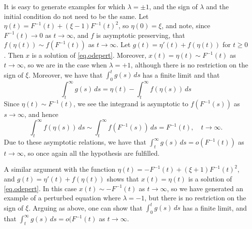 \documentclass[a4paper,10pt,reqno]{amsart}
\numberwithin{equation}{section}
\theoremstyle{definition}
\theoremstyle{remark}
\DeclareMathOperator{\1}{\mathbbm 1}
\begin{document}
	It is easy to generate examples for which $\lambda=\pm 1$, and the sign of $\lambda$ and the initial condition do not need to be the same. Let $\eta(t)=F^{-1}(t)+(\xi-1)F^{-1}(t)^2$, so $\eta(0)=\xi$, and note, since $F^{-1}(t)\to 0$ as $t\to\infty$, and $f$ is asymptotic preserving, that $f(\eta(t))\sim f(F^{-1}(t))$ as $t\to\infty$. Let $g(t)=\eta'(t)+f(\eta(t))$ for $t\geq 0$. Then $x$ is a solution of \eqref{eq.odepert}. Moreover, $x(t)=\eta(t)\sim F^{-1}(t)$ as $t\to\infty$, so we are in the case when $\lambda=+1$, although there is no restriction on the sign of $\xi$. Moreover, we have that $\int_0^t g(s)\,ds$ has a finite limit and that 
	\[
	\int_t^\infty g(s)\,ds = \eta(t)-\int_t^\infty f(\eta(s))\,ds
	\]   
	Since $\eta(t)\sim F^{-1}(t)$, we see the integrand is asymptotic  to $f(F^{-1}(s))$ as $s\to\infty$, and hence 
	\[
	\int_{t}^\infty  f(\eta(s))\,ds\sim \int_t^\infty f(F^{-1}(s))\,ds = F^{-1}(t), \quad t\to \infty. 
	\]
	Due to these asymptotic relations, we have that $\int_t^\infty g(s)\,ds=o(F^{-1}(t))$ as $t\to\infty$, so once again all the hypothesis are fulfilled.
	
	A similar argument with the function $\eta(t)=-F^{-1}(t)+(\xi+1)F^{-1}(t)^2$, and $g(t)=\eta'(t)+f(\eta(t))$ shows that $x(t)=\eta(t)$ is a solution of \eqref{eq.odepert}. In this case $x(t)\sim -F^{-1}(t)$ as $t\to\infty$, so we have generated an example of a perturbed equation where $\lambda=-1$, but there is no restriction on the sign of $\xi$. Arguing as above, one can show that $\int_0^t g(s)\,ds$ has a finite limit, and that $\int_t^\infty g(s)\,ds = o(F^{-1}(t)$ as $t\to\infty$.   
	
\end{document}
